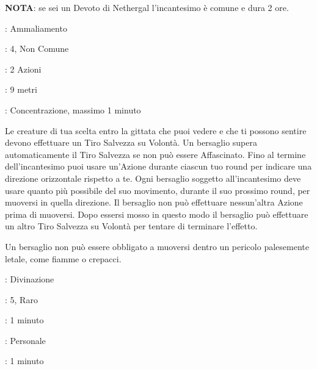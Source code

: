 \begin{multicols}{2}
\textbf{NOTA}: se sei un Devoto di Nethergal l'incantesimo è comune e dura 2 ore.

\noindent\colorbox{OBSSgold!10}{
\begin{minipage}{0.95\linewidth}
\begin{description}[noitemsep, topsep=0pt, parsep=0pt, partopsep=0pt, leftmargin=0cm, labelwidth=1.3cm]
	\item[\textbf{Lista}]: Ammaliamento
	\item[\textbf{Livello}]: 4, Non Comune
	\item[\textbf{Lancio}]: 2 Azioni
	\item[\textbf{Gittata}]: 9 metri
	\item[\textbf{Durata}]: Concentrazione, massimo 1 minuto
\end{description}
\end{minipage}}\smallskip

Le creature di tua scelta entro la gittata che puoi vedere e che ti possono sentire devono effettuare un Tiro Salvezza su Volontà. Un bersaglio supera automaticamente il Tiro Salvezza se non può essere Affascinato. Fino al termine dell'incantesimo puoi usare un'Azione durante ciascun tuo round per indicare una direzione orizzontale rispetto a te. Ogni bersaglio soggetto all'incantesimo deve usare quanto più possibile del suo movimento, durante il suo prossimo round, per muoversi in quella direzione. Il bersaglio non può effettuare nessun'altra Azione prima di muoversi. Dopo essersi mosso in questo modo il bersaglio può effettuare un altro Tiro Salvezza su Volontà per tentare di terminare l'effetto.

Un bersaglio non può essere obbligato a muoversi dentro un pericolo palesemente letale, come fiamme o crepacci.

\noindent\colorbox{OBSSgold!10}{
\begin{minipage}{0.95\linewidth}
\begin{description}[noitemsep, topsep=0pt, parsep=0pt, partopsep=0pt, leftmargin=0cm, labelwidth=1.3cm]
	\item[\textbf{Lista}]: Divinazione
	\item[\textbf{Livello}]: 5, Raro
	\item[\textbf{Lancio}]: 1 minuto
	\item[\textbf{Gittata}]: Personale
	\item[\textbf{Durata}]: 1 minuto
\end{description}
\end{minipage}}\smallskip


\end{multicols}
